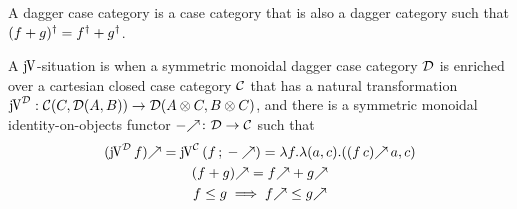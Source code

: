 \documentclass[runningheads,envcountsame]{llncs}
\begin{document}
\begin{definition}
    A dagger case category is a case category that is also a dagger category such that $\rev{(f + g)} = \rev{f} + \rev{g}$.
    
    A $\juncurry$-situation is when a symmetric monoidal dagger case category $\mathcal{D}$ is enriched over a cartesian closed case category $\mathcal{C}$ that has a natural transformation $\juncurry[\D]: \homC{C}{\homD{A}{B}} \to \homD{\tensor{A}{C}}{\tensor{B}{C}}$, and there is a symmetric monoidal identity-on-objects functor $\f{-}\colon \D \to \C$ such that 
    \begin{gather}
        \f{(\juncurry[\D]\,f)} = \juncurry[\C]\,(\comp{f}{\f{-}}) = \lambda f. \lambda (a, c). (\f{(f\,c)}\,a, c) \\
        \f{(f + g)} = \f{f} + \f{g} \\
        f \leq g \implies \f{f} \leq \f{g}
    \end{gather}
\end{definition}
\end{document}
